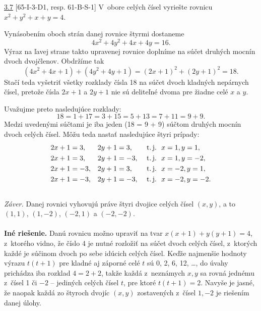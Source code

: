 \begin{tcolorbox}[breakable,notitle,boxrule=0pt,colback=light-gray,colframe=light-gray]\ul{3.7} [65-I-3-D1, resp. 61-B-S-1] V~obore celých čísel vyriešte rovnicu $x^2+ y^2+ x + y = 4$.

\end{tcolorbox}

\rieh Vynásobením oboch strán danej rovnice štyrmi dostaneme $$4x^2 + 4y^2 + 4x + 4y = 16.$$
Výraz na ľavej strane takto upravenej rovnice doplníme na súčet druhých mocnín dvoch dvojčlenov. Obdržíme tak
$$(4x^2 + 4x + 1) + (4y^2 + 4y + 1) = (2x + 1)^2 + (2y + 1)^2 = 18.$$
Stačí teda vyšetriť všetky rozklady čísla 18 na súčet dvoch kladných nepárnych čísel, pretože čísla $2x + 1$ a $2y + 1$ nie sú deliteľné dvoma pre žiadne celé $x$ a $y$.

Uvažujme preto nasledujúce rozklady:
$$18 = 1 + 17 = 3 + 15 = 5 + 13 = 7 + 11 = 9 + 9.$$
Medzi uvedenými súčtami je iba jeden (18 = 9 + 9) súčtom druhých mocnín dvoch celých čísel. Môžu teda nastať nasledujúce štyri prípady:
\begin{align*}
2x + 1 &= 3, &  2y + 1 &= 3, & \text{ t.\,j.}\ \  x &= 1, y = 1,\\
2x + 1 &= 3, & 2y + 1 &= -3, & \text{ t.\,j.} \ \ x &= 1, y = -2,\\
2x + 1 &= -3, & 2y + 1 &= 3, & \text{ t.\,j.} \ \ x &= -2, y = 1,\\
2x + 1 &= -3, & 2y + 1 &=-3, & \text{ t.\,j.} \ \  x &= -2, y = -2.\\\
\end{align*}
\textit{Záver.} Danej rovnici vyhovujú práve štyri dvojice celých čísel $(x, y)$, a to $(1, 1)$, $(1, -2)$, $(-2, 1)$ a $(-2, -2)$.\\
\\
\textbf{Iné riešenie.} Danú rovnicu možno upraviť na tvar $x(x + 1) + y(y + 1) = 4$, z~ktorého vidno, že číslo 4 je nutné rozložiť na súčet dvoch celých čísel, z~ktorých každé je súčinom dvoch po sebe idúcich celých čísel. Keďže najmenšie hodnoty výrazu $t(t+ 1)$ pre kladné aj záporné celé $t$ sú 0, 2, 6, 12, \ldots , do úvahy prichádza iba rozklad $4 = 2 + 2$, takže každá z~neznámych $x, y$ sa rovná jednému z~čísel 1 či $-2$ -- jediných celých čísel $t$, pre ktoré $t(t+ 1) = 2$. Navyše je jasné, že naopak každá zo štyroch dvojíc $(x, y)$ zostavených z~čísel $1, -2$ je riešením danej úlohy.